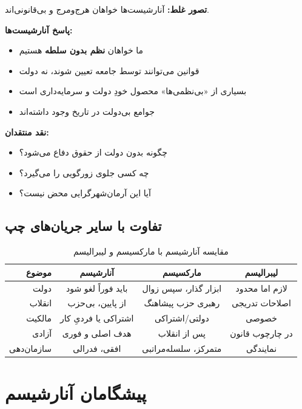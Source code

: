 \begin{debatebox}
\textbf{تصور غلط:} آنارشیست‌ها خواهان هرج‌ومرج و بی‌قانونی‌اند.

\textbf{پاسخ آنارشیست‌ها:}
\begin{itemize}[nosep]
    \item ما خواهان \textbf{نظم بدون سلطه} هستیم
    \item قوانین می‌توانند توسط جامعه تعیین شوند، نه دولت
    \item بسیاری از «بی‌نظمی‌ها» محصول خودِ دولت و سرمایه‌داری است
    \item جوامع بی‌دولت در تاریخ وجود داشته‌اند
\end{itemize}

\textbf{نقد منتقدان:}
\begin{itemize}[nosep]
    \item چگونه بدون دولت از حقوق دفاع می‌شود؟
    \item چه کسی جلوی زورگویی را می‌گیرد؟
    \item آیا این آرمان‌شهرگرایی محض نیست؟
\end{itemize}
\end{debatebox}

\subsection{تفاوت با سایر جریان‌های چپ}

\begin{table}[htbp]
\centering
\caption{مقایسه آنارشیسم با مارکسیسم و لیبرالیسم}
\label{tab:anarchism-compare}
\begin{tabular}{r|c|c|c}
\toprule
\textbf{موضوع} & \textbf{آنارشیسم} & \textbf{مارکسیسم} & \textbf{لیبرالیسم} \\
\midrule
دولت & باید فوراً لغو شود & ابزار گذار، سپس زوال & لازم اما محدود \\
انقلاب & از پایین، بی‌حزب & رهبری حزب پیشاهنگ & اصلاحات تدریجی \\
مالکیت & اشتراکی یا فردیِ کار & دولتی/اشتراکی & خصوصی \\
آزادی & هدف اصلی و فوری & پس از انقلاب & در چارچوب قانون \\
سازمان‌دهی & افقی، فدرالی & متمرکز، سلسله‌مراتبی & نمایندگی \\
\bottomrule
\end{tabular}
\end{table}

\section{پیشگامان آنارشیسم}

